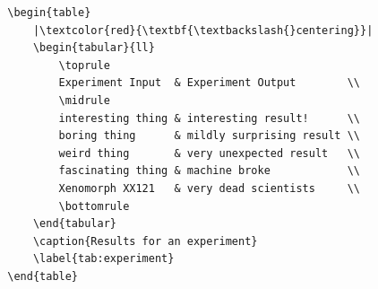 \documentclass[article,a4paper,oneside,10pt]{memoir}
\newcommand\code[1]{\texttt{#1}}
\begin{document}
\cite{stackexch:center-centering}
\begin{listing}
    \begin{verbatim}
        \begin{table}
            |\textcolor{red}{\textbf{\textbackslash{}centering}}|
            \begin{tabular}{ll}
                \toprule
                Experiment Input  & Experiment Output        \\
                \midrule
                interesting thing & interesting result!      \\
                boring thing      & mildly surprising result \\
                weird thing       & very unexpected result   \\
                fascinating thing & machine broke            \\
                Xenomorph XX121   & very dead scientists     \\
                \bottomrule
            \end{tabular}
            \caption{Results for an experiment}
            \label{tab:experiment}
        \end{table}
    \end{verbatim}
    \caption{%
        Centering  a  \texttt{tabular}   environment  inside  a \texttt{table}
        floating environment}
    \label{lst:figure}
\end{listing}

%

\end{document}
